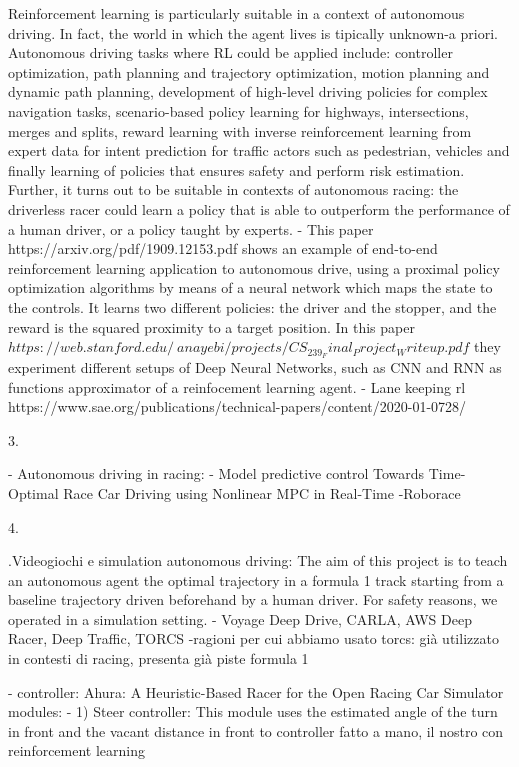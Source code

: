 Reinforcement learning is particularly suitable in a context of autonomous driving. In fact, the world in which the agent lives is tipically unknown-a priori.
Autonomous driving tasks where RL could be applied include: controller optimization, path planning and trajectory optimization, motion planning and dynamic path planning, development of high-level driving policies for complex navigation tasks, scenario-based policy learning for highways, intersections, merges and splits, reward learning with inverse reinforcement learning from expert data for intent prediction for traffic actors such as pedestrian, vehicles and finally learning of policies that ensures safety and perform risk estimation. Further, it turns out to be suitable in contexts of autonomous racing: the driverless racer could learn a policy that is able to outperform the performance of a human driver, or a policy taught by experts.
- This paper https://arxiv.org/pdf/1909.12153.pdf shows an example of end-to-end reinforcement learning application to autonomous drive, using a proximal policy optimization algorithms by means of a neural network which maps the state to the controls. It learns two different policies: the driver and the stopper, and the reward is the squared proximity to a target position.
In this paper $https://web.stanford.edu/~anayebi/projects/CS_239_Final_Project_Writeup.pdf$ they experiment different setups of Deep Neural Networks, such as CNN and RNN as functions approximator of a reinfocement learning agent.
- Lane keeping rl https://www.sae.org/publications/technical-papers/content/2020-01-0728/


3.

- Autonomous driving in racing:
- Model predictive control Towards Time-Optimal Race Car Driving using Nonlinear MPC in
Real-Time
-Roborace



4.

.Videogiochi e simulation autonomous driving:
The aim of this project is to teach an autonomous agent the optimal trajectory in a formula 1 track starting from a baseline trajectory driven beforehand by a human driver. For safety reasons, we operated in a simulation setting.
- Voyage Deep Drive, CARLA, AWS Deep Racer, Deep Traffic, TORCS
	-ragioni per cui abbiamo usato torcs: già utilizzato in contesti di racing, presenta già piste formula 1


- controller: Ahura: A Heuristic-Based Racer for the Open Racing Car Simulator
	modules:
	- 1) Steer controller: This module uses the estimated angle
of the turn in front and the vacant distance in front to
		controller fatto a mano, il nostro con reinforcement learning
		

